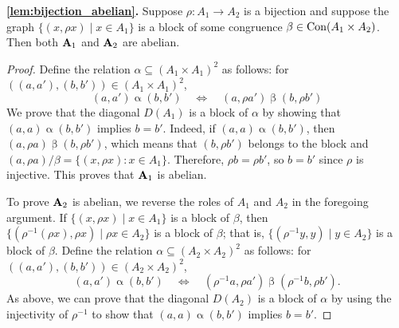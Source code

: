 \begin{lem}{\bf\ref{lem:bijection_abelian}.}
Suppose $\rho: A_1 \to A_2$ is a bijection and suppose the graph
$\{(x, \rho x) \mid x \in A_1\}$ is a block of some congruence
$\beta \in \operatorname{Con} (A_1 \times A_2)$.  Then both $\mathbf{A}_1$ and $\mathbf{A}_2$ are abelian.
\end{lem}
\begin{proof}
  Define the relation $\alpha\subseteq (A_1\times A_1)^2$ as follows: for
  $((a,a'), (b,b')) \in (A_1\times A_1)^2$,
  \[
  (a,a')\mathrel{\alpha} (b,b')
  \quad \iff \quad
  (a, \rho a') \mathrel{\beta} (b, \rho b')
  \]
  We prove that the diagonal $D(A_1)$ is a block of $\alpha$ by showing that
  $(a, a) \mathrel{\alpha} (b,b')$ implies $b = b'$.
  Indeed, if $(a, a) \mathrel{\alpha} (b,b')$, then
  $(a, \rho a) \mathrel{\beta} (b, \rho b')$, which means that
  $(b, \rho b')$ belongs to the block and
  $(a, \rho a)/\beta = \{(x, \rho x): x\in A_1\}$.  Therefore,
  $\rho b  = \rho b'$, so $b = b'$ since $\rho$ is injective.
  This proves that $\mathbf{A}_1$ is abelian.

  To prove $\mathbf{A}_2$ is abelian, we reverse the roles of $A_1$ and $A_2$ in the
  foregoing argument.  
  If $\{(x, \rho x) \mid x \in A_1\}$ is a block of $\beta$,
  then 
  $\{(\rho^{-1}(\rho x), \rho x) \mid \rho x \in A_2\}$ is a block of $\beta$; that
  is, $\{(\rho^{-1} y, y) \mid y \in A_2\}$ is a block of $\beta$.  Define 
  the relation $\alpha\subseteq (A_2\times A_2)^2$ as follows: for
  $((a,a'), (b,b')) \in (A_2\times A_2)^2$,
  \[
  (a,a')\mathrel{\alpha} (b,b')
  \quad \iff \quad
  (\rho^{-1}a, \rho a') \mathrel{\beta} (\rho^{-1}b, \rho b').
  \]
  As above, we can prove that the diagonal $D(A_2)$ is a block of $\alpha$
  by using the injectivity of $\rho^{-1}$ to show that $(a, a) \mathrel{\alpha}
  (b,b')$
  implies $b = b'$.
\end{proof}

